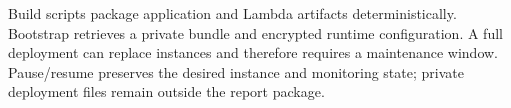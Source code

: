 Build scripts package application and Lambda artifacts deterministically. Bootstrap retrieves a private bundle and encrypted runtime configuration. A full deployment can replace instances and therefore requires a maintenance window. Pause/resume preserves the desired instance and monitoring state; private deployment files remain outside the report package.
